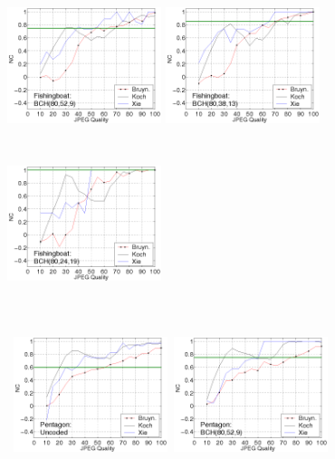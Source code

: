 \documentclass[10pt,twocolumn]{article}
\begin{document}
\begin{figure}[!htb]
{{        \includegraphics[height=4.5cm,width=4.5cm]{Fishingboat80_52_9.png}
        \includegraphics[height=4.5cm,width=4.5cm]{Fishingboat80_38_13.png}
        \includegraphics[height=4.5cm,width=4.5cm]{Fishingboat80_24_19.png}
}} 
\centerline{ \hbox{
        \includegraphics[height=4.5cm,width=4.5cm]{Pentagon80_80_1.png}
        \includegraphics[height=4.5cm,width=4.5cm]{Pentagon80_52_9.png}
}}
\end{figure}
\end{document}
